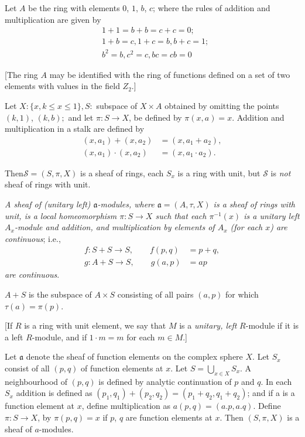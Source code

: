 \begin{exam}\label{chap2:exam5}%
Let $A$ be the ring with elements $0$, $1$, $b$, $c$; where the rules of
addition and multiplication are given by 
\begin{align*}
& 1+ 1 = b+b = c+ c=0;\\
& 1+b =c, 1+c =b, b+c =1;\\
&b^2 =b, c^2=c, bc= cb =0
\end{align*} 
\end{exam}

[The ring $A$ may be identified with the ring of functions defined on
  a set of two elements with values in the field $Z_2$.] 

Let $X: \{ x, k \leq x \leq 1 \},S:$ subspace of $X \times A$ obtained
by omitting the points $(k,1)$, $(k,b);$ and let $\pi : S \to X$, be
defined by $\pi (x,a) = x$. Addition and multiplication in a stalk are
defined by  
\begin{align*}
(x,a_1) + (x,a_2) & = (x,a_1 + a_2),\\
(x,a_1) \cdot (x,a_2) & = (x,a_1 \cdot a_2).
\end{align*}

\noindent
Then\pageoriginale $\mathscr{S} = (S, \pi, X)$ is a sheaf of rings,
each $S_x$ is a ring with unit, but $\mathscr{S}$ is \textit{not}
sheaf of rings with unit.  

\textit{A sheaf of (unitary left) $\mathfrak{a}$-modules, where
  $\mathfrak{a} = (A, \tau,  X)$ is a sheaf of rings with unit, is a
  local homeomorphism $\pi : S 
  \to X$ such that each $\pi^{-1}(x)$ is a unitary left $A_x$-module
  and addition, and multiplication by elements of $A_x$ (for each $x$)
  are continuous}; i.e.,  
\begin{align*}
f:S+ S \to S, \qquad f(p,q) & = p+q,\\
g:A+ S \to S, \qquad g(a,p) & = ap
\end{align*}
\textit{are continuous}.

$A+S$ is the subspace of $A \times S$ consisting of all pairs $(a,p)$
for which $\tau(a) = \pi(p)$. 

[If $R$ is a ring with unit element, we say that $M$ is a
  \textit{unitary, left} $R$-module if it is a left $R$-module, and
  if $1\cdot m=m$ for each $m \in M$.] 

\begin{exam}%
Let $\mathfrak{a}$ denote the sheaf of function elements on the complex sphere
$X$. Let $S_x$ consist of all $(p,q)$ of function elements at $x$. Let
$S = \bigcup\limits_{x \in X} S_x$. A neighbourhood of $(p,q)$ is defined
by analytic continuation of $p$ and $q$. In each $S_x$ addition is
defined as $(p_1,q_1)+(p_2,q_2)=(p_1+q_2,q_1+q_2)$; and if a is a
function element at $x$, define multiplication as $a(p,q)
=(a.p, a.q)$. Define $\pi : S \to X$, by $\pi(p,q)=x$ if $p$, $q$ are
function elements at $x$. Then $(S, \pi, X)$ is a sheaf of
$a$-modules. 
\end{exam}

